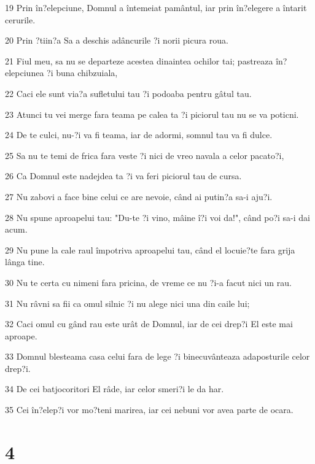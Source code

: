 \par 19 Prin în?elepciune, Domnul a întemeiat pamântul, iar prin în?elegere a întarit cerurile.
\par 20 Prin ?tiin?a Sa a deschis adâncurile ?i norii picura roua.
\par 21 Fiul meu, sa nu se departeze acestea dinaintea ochilor tai; pastreaza în?elepciunea ?i buna chibzuiala,
\par 22 Caci ele sunt via?a sufletului tau ?i podoaba pentru gâtul tau.
\par 23 Atunci tu vei merge fara teama pe calea ta ?i piciorul tau nu se va poticni.
\par 24 De te culci, nu-?i va fi teama, iar de adormi, somnul tau va fi dulce.
\par 25 Sa nu te temi de frica fara veste ?i nici de vreo navala a celor pacato?i,
\par 26 Ca Domnul este nadejdea ta ?i va feri piciorul tau de cursa.
\par 27 Nu zabovi a face bine celui ce are nevoie, când ai putin?a sa-i aju?i.
\par 28 Nu spune aproapelui tau: "Du-te ?i vino, mâine î?i voi da!", când po?i sa-i dai acum.
\par 29 Nu pune la cale raul împotriva aproapelui tau, când el locuie?te fara grija lânga tine.
\par 30 Nu te certa cu nimeni fara pricina, de vreme ce nu ?i-a facut nici un rau.
\par 31 Nu râvni sa fii ca omul silnic ?i nu alege nici una din caile lui;
\par 32 Caci omul cu gând rau este urât de Domnul, iar de cei drep?i El este mai aproape.
\par 33 Domnul blesteama casa celui fara de lege ?i binecuvânteaza adaposturile celor drep?i.
\par 34 De cei batjocoritori El râde, iar celor smeri?i le da har.
\par 35 Cei în?elep?i vor mo?teni marirea, iar cei nebuni vor avea parte de ocara.

\chapter{4}

